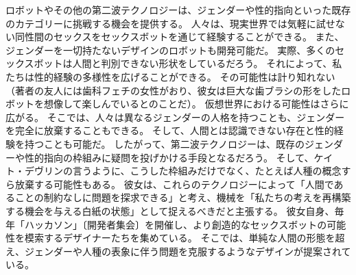 \documentclass[paper=a4,book,openany]{jlreq}
\begin{document}
ロボットやその他の第二波テクノロジーは、ジェンダーや性的指向といった既存のカテゴリーに挑戦する機会を提供する。
人々は、現実世界では気軽に試せない同性間のセックスをセックスボットを通じて経験することができる。
また、ジェンダーを一切持たないデザインのロボットも開発可能だ。
実際、多くのセックスボットは人間と判別できない形状をしているだろう。
それによって、私たちは性的経験の多様性を広げることができる。
その可能性は計り知れない（著者の友人には歯科フェチの女性がおり、彼女は巨大な歯ブラシの形をしたロボットを想像して楽しんでいるとのことだ）。
仮想世界における可能性はさらに広がる。
そこでは、人々は異なるジェンダーの人格を持つことも、ジェンダーを完全に放棄することもできる。
そして、人間とは認識できない存在と性的経験を持つことも可能だ。
したがって、第二波テクノロジーは、既存のジェンダーや性的指向の枠組みに疑問を投げかける手段となるだろう。
そして、ケイト・デヴリンの言うように、こうした枠組みだけでなく、たとえば人種の概念すら放棄する可能性もある。
彼女は、これらのテクノロジーによって「人間であることの制約なしに問題を探求できる」と考え、機械を「私たちの考えを再構築する機会を与える白紙の状態」として捉えるべきだと主張する\citep{devlin15:_in_defen_sex_machin}。
彼女自身、毎年「ハッカソン」〔開発者集会〕を開催し、より創造的なセックスボットの可能性を模索するデザイナーたちを集めている。
そこでは、単純な人間の形態を超え、ジェンダーや人種の表象に伴う問題を克服するようなデザインが提案されている。
\end{document}
